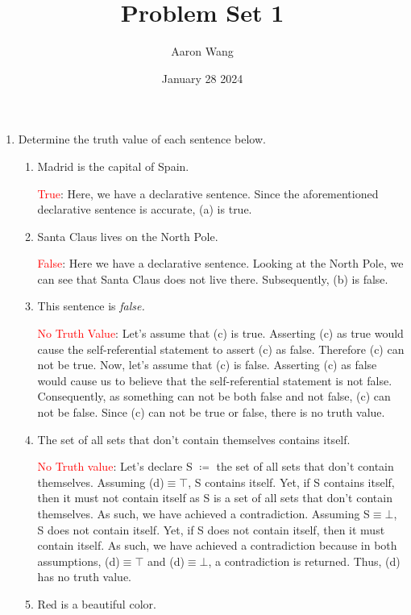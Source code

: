 \documentclass{article}
\title{Problem Set 1}
\author{Aaron Wang}
\date{January 28 2024}
\begin{document}
\maketitle

\begin{enumerate}
    \item 
        Determine the truth value of each sentence below.
    \begin{enumerate}
 	\item 
            Madrid is the capital of Spain.
            
            \textcolor{red}{True}: Here, we have a declarative sentence. Since the aforementioned declarative sentence is accurate, (a) is true.
\vspace{0.1in}
 	\item Santa Claus lives on the North Pole.
            
            \textcolor{red}{False}: Here we have a declarative sentence. Looking at the North Pole, we can see that Santa Claus does not live there. Subsequently, (b) is false.
\vspace{0.1in}
        \item This sentence is \emph{false.}
            
            \textcolor{red}{No Truth Value}: Let's assume that (c) is true. Asserting (c) as true would cause the self-referential statement to assert (c) as false. Therefore (c) can not be true. Now, let's assume that (c) is false. Asserting (c) as false would cause us to believe that the self-referential statement is not false. Consequently, as something can not be both false and not false, (c) can not be false. Since (c) can not be true or false, there is no truth value.
\vspace{0.1in}
        \item The set of all sets that don't contain themselves contains itself.
            
            \textcolor{red}{No Truth value}: Let's declare S $\coloneqq$ the set of all sets that don't contain themselves. Assuming (d)$\equiv\top$, S contains itself. Yet, if S contains itself, then it must not contain itself as S is a set of all sets that don't contain themselves. As such, we have achieved a contradiction. Assuming S$\equiv\bot$, S does not contain itself. Yet, if S does not contain itself, then it must contain itself. As such, we have achieved a contradiction because in both assumptions, (d)$\equiv\top$ and (d)$\equiv\bot$, a contradiction is returned. Thus, (d) has no truth value.
            \vspace{0.1in}
        \item Red is a beautiful color.
            

\end{enumerate}
\end{enumerate}
\end{document}

